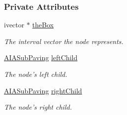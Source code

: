 \subsubsection*{\-Private \-Attributes}
\begin{DoxyCompactItemize}
\item 
ivector $\ast$ \hyperlink{classAIASPnode_ab904c07918618a89d5511fbaf87f5143}{the\-Box}
\begin{DoxyCompactList}\small\item\em \-The interval vector the node represents. \end{DoxyCompactList}\item 
\hyperlink{AIAsubpaving_8hpp_ab6618d8727b32e897c1b7ab3415b93ff}{\-A\-I\-A\-Sub\-Paving} \hyperlink{classAIASPnode_a64dc679fe03b03b7beb6ddb04b2a0f85}{left\-Child}
\begin{DoxyCompactList}\small\item\em \-The node's left child. \end{DoxyCompactList}\item 
\hyperlink{AIAsubpaving_8hpp_ab6618d8727b32e897c1b7ab3415b93ff}{\-A\-I\-A\-Sub\-Paving} \hyperlink{classAIASPnode_adbaa03014929ff2ab653d6d916ca2fc1}{right\-Child}
\begin{DoxyCompactList}\small\item\em \-The node's right child. \end{DoxyCompactList}\end{DoxyCompactItemize}
